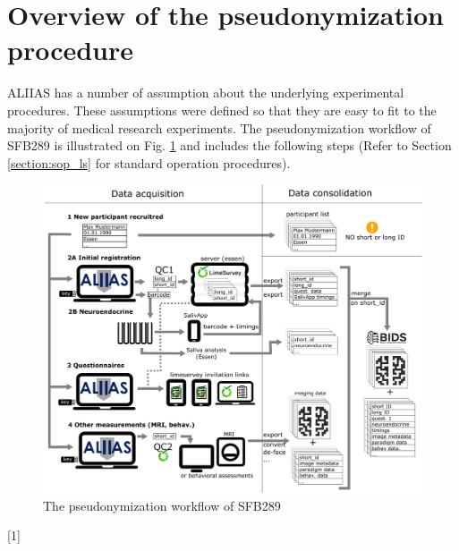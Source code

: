 \section{Overview of the pseudonymization procedure}
ALIIAS has a number of assumption about the underlying experimental procedures. These assumptions were defined so that they are easy to fit to the majority of medical research experiments. The pseudonymization workflow of SFB289 is illustrated on Fig. \ref{fig:flowchart} and includes the following steps (Refer to Section \ref{section:sop_ls} for standard operation procedures).

\begin{figure}[H]
\centering
\includegraphics[width=1.0\textwidth]{docs/fig/overview_v3.eps}
\caption{The pseudonymization workflow of SFB289}
\label{fig:flowchart}
\end{figure}

[1]

